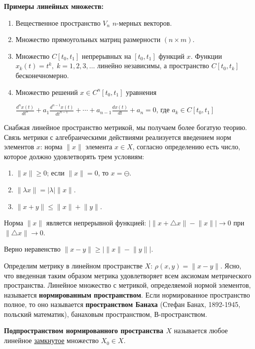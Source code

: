 \documentclass[12pt,a4paper,titlepage]{book}
\begin{document}
\textbf{Примеры линейных множеств:}
\begin{enumerate}
\item Вещественное пространство $V_n$ $n$-мерных векторов.
\item Множество прямоугольных матриц размерности $(n\times m)$.
\item Множество $C[t_0,t_1]$ непрерывных на $[t_0,t_1]$ функций $x$. Функции $x_k(t)=t^k,\; k=1,2,3,\dotsc$ линейно независимы, а пространство $C[t_0,t_k]$ бесконечномерно.
\item Множество решений $x\in C^n[t_0,t_1]$ уравнения
\begin{center}
$\frac{d^nx(t)}{dt^n}+a_1\frac{d^{n-1}x(t)}{dt^{n-1}}+\dotsb+a_{n-1}\frac{dx(t)}{dt}+a_n=0$, где $a_k\in C[t_0,t_1]$
\end{center}
\end{enumerate}
\par Снабжая линейное пространство метрикой, мы получаем более богатую теорию. Связь метрики с алгебраическими действиями реализуется введением норм элементов $x$: норма $\lVert x\rVert$ элемента $x\in X$, согласно определению есть число, которое должно удовлетворять трем условиям:
\begin{enumerate}
\item $\lVert x\rVert \geq 0$; если $\lVert x\rVert = 0$, то $x=\ominus$.
\item $\lVert \lambda x \rVert = \lvert \lambda \rvert \lVert x \rVert$.
\item $\lVert x+y \rVert\leq\lVert x \rVert + \lVert y \rVert$.
\end{enumerate}
\par Норма $\lVert x\rVert$ является непрерывной функцией: $\lvert\lVert x+\triangle x\rVert-\lVert x\rVert\rvert\to0$ при $\lVert\triangle x\rVert\to0$.
\par Верно неравенство $\lVert x-y\rVert\geq\lvert\lVert x\rVert-\lVert y\rVert\rvert$.
\par Определим метрику в линейном пространстве $X$: $\rho(x,y)=\lVert x-y\rVert$. Ясно, что введенная таким образом метрика удовлетворяет всем аксиомам метрического пространства. Линейное множество с метрикой, определяемой нормой элементов, называется \textbf{нормированным пространством}. Если нормированное пространство полное, то оно называется \textbf{пространством Банаха} (Стефан Банах, 1892-1945, польский математик), банаховым пространством, В-пространством.
\par \textbf{Подпространством нормированного пространства $X$} называется любое линейное \underline{замкнутое} множество $X_0 \in X$.
\end{document}
